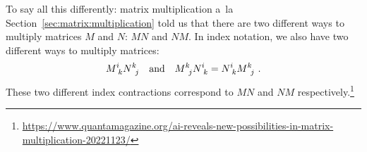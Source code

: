To say all this differently: matrix multiplication a~la  Section~\ref{sec:matrix:multiplication} told us that there are two different ways to multiply matrices $M$ and $N$: $MN$ and $NM$. In index notation, we also have two different ways to multiply matrices:
\begin{align}
    M\aij{i}{k}N\aij{k}{j}
    &&\text{and}&&
    M\aij{k}{j}N\aij{i}{k} = N\aij{i}{k}M\aij{k}{j} \ .
\end{align}
These two different index contractions correspond to $MN$ and $NM$ respectively.\footnote{\url{https://www.quantamagazine.org/ai-reveals-new-possibilities-in-matrix-multiplication-20221123/}}



